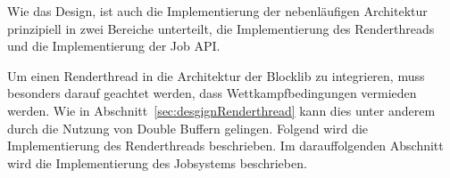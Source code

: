 Wie das Design, ist auch die Implementierung der nebenläufigen Architektur prinzipiell in zwei Bereiche unterteilt, die Implementierung des Renderthreads und die Implementierung der Job API.

Um einen Renderthread in die Architektur der Blocklib zu integrieren, muss besonders darauf geachtet werden, dass Wettkampfbedingungen vermieden werden. Wie in Abschnitt~\ref{sec:desgignRenderthread} kann dies unter anderem durch die Nutzung von Double Buffern gelingen. Folgend wird die Implementierung des Renderthreads beschrieben. Im darauffolgenden Abschnitt wird die Implementierung des Jobsystems beschrieben.